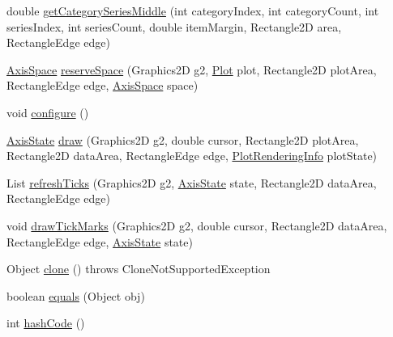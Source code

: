 \begin{DoxyCompactItemize}
\item 
double \mbox{\hyperlink{classorg_1_1jfree_1_1chart_1_1axis_1_1_category_axis_ad51f909310dc6e18e3188f5110491a31}{get\+Category\+Series\+Middle}} (int category\+Index, int category\+Count, int series\+Index, int series\+Count, double item\+Margin, Rectangle2D area, Rectangle\+Edge edge)
\item 
\mbox{\hyperlink{classorg_1_1jfree_1_1chart_1_1axis_1_1_axis_space}{Axis\+Space}} \mbox{\hyperlink{classorg_1_1jfree_1_1chart_1_1axis_1_1_category_axis_a217be770d9046a04614a52cc73da8d75}{reserve\+Space}} (Graphics2D g2, \mbox{\hyperlink{classorg_1_1jfree_1_1chart_1_1plot_1_1_plot}{Plot}} plot, Rectangle2D plot\+Area, Rectangle\+Edge edge, \mbox{\hyperlink{classorg_1_1jfree_1_1chart_1_1axis_1_1_axis_space}{Axis\+Space}} space)
\item 
void \mbox{\hyperlink{classorg_1_1jfree_1_1chart_1_1axis_1_1_category_axis_aeba3de708fb4871055f2464b40ee582d}{configure}} ()
\item 
\mbox{\hyperlink{classorg_1_1jfree_1_1chart_1_1axis_1_1_axis_state}{Axis\+State}} \mbox{\hyperlink{classorg_1_1jfree_1_1chart_1_1axis_1_1_category_axis_aa5d85b293ca931bb84909df95791e842}{draw}} (Graphics2D g2, double cursor, Rectangle2D plot\+Area, Rectangle2D data\+Area, Rectangle\+Edge edge, \mbox{\hyperlink{classorg_1_1jfree_1_1chart_1_1plot_1_1_plot_rendering_info}{Plot\+Rendering\+Info}} plot\+State)
\item 
List \mbox{\hyperlink{classorg_1_1jfree_1_1chart_1_1axis_1_1_category_axis_ab4d7f543ddb1fd823e44a215cc504be3}{refresh\+Ticks}} (Graphics2D g2, \mbox{\hyperlink{classorg_1_1jfree_1_1chart_1_1axis_1_1_axis_state}{Axis\+State}} state, Rectangle2D data\+Area, Rectangle\+Edge edge)
\item 
void \mbox{\hyperlink{classorg_1_1jfree_1_1chart_1_1axis_1_1_category_axis_a6f488ea89f9864894e8cbdf4c58997c9}{draw\+Tick\+Marks}} (Graphics2D g2, double cursor, Rectangle2D data\+Area, Rectangle\+Edge edge, \mbox{\hyperlink{classorg_1_1jfree_1_1chart_1_1axis_1_1_axis_state}{Axis\+State}} state)
\item 
Object \mbox{\hyperlink{classorg_1_1jfree_1_1chart_1_1axis_1_1_category_axis_a12d8084f2602990fb74c11f58b18fb4c}{clone}} ()  throws Clone\+Not\+Supported\+Exception 
\item 
boolean \mbox{\hyperlink{classorg_1_1jfree_1_1chart_1_1axis_1_1_category_axis_aa3b493d8bcb52845a8006a5e8db1693b}{equals}} (Object obj)
\item 
int \mbox{\hyperlink{classorg_1_1jfree_1_1chart_1_1axis_1_1_category_axis_a07d2330604ff51eb37569de16343a12a}{hash\+Code}} ()
\end{DoxyCompactItemize}
